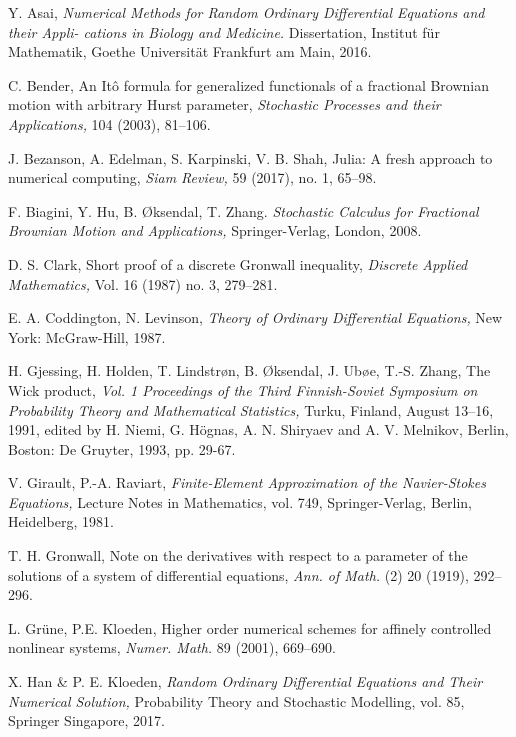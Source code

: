 \documentclass[reqno,12pt]{amsart}
\theoremstyle{plain}%
\theoremstyle{definition}
\begin{document}
\begin{thebibliography}{25}
     Y. Asai, \emph{Numerical Methods for Random Ordinary Differential Equations and their Appli-
    cations in Biology and Medicine.} Dissertation, Institut f\"ur Mathematik, Goethe Universit\"at Frankfurt am Main, 2016. 

     C. Bender, An It\^o formula for generalized functionals of a fractional Brownian motion with arbitrary Hurst parameter, \emph{Stochastic Processes and their Applications,} 104 (2003), 81--106.

     J. Bezanson, A. Edelman, S. Karpinski, V. B. Shah, Julia: A fresh approach to numerical computing, \emph{Siam Review,} 59 (2017), no. 1, 65--98.

     F. Biagini, Y. Hu, B. {\O}ksendal, T. Zhang. \emph{Stochastic Calculus for Fractional Brownian Motion and Applications,} Springer-Verlag, London, 2008.

     D. S. Clark, Short proof of a discrete Gronwall inequality, \emph{Discrete Applied Mathematics,} Vol. 16 (1987) no. 3, 279--281.

     E. A. Coddington, N. Levinson, \emph{Theory of Ordinary Differential Equations,} New York: McGraw-Hill, 1987.

     H. Gjessing, H. Holden, T. Lindstr{\o}n, B. {\O}ksendal, J. Ub{\o}e, T.-S. Zhang, The Wick product, \emph{Vol. 1 Proceedings of the Third Finnish-Soviet Symposium on Probability Theory and Mathematical Statistics,} Turku, Finland, August 13--16, 1991, edited by H. Niemi, G. H\"ognas, A. N. Shiryaev and A. V. Melnikov, Berlin, Boston: De Gruyter, 1993, pp. 29-67.

     V. Girault, P.-A. Raviart, \emph{Finite-Element Approximation of the Navier-Stokes Equations,} Lecture Notes in Mathematics, vol. 749, Springer-Verlag, Berlin, Heidelberg, 1981.

     T. H. Gronwall, Note on the derivatives with respect to a parameter of the solutions of a system of differential equations, \emph{Ann. of Math.} (2) 20 (1919), 292--296.

     L. Gr\"une, P.E. Kloeden, Higher order numerical schemes for affinely controlled nonlinear systems, \emph{Numer. Math.} 89 (2001), 669--690.

     X. Han \& P. E. Kloeden, \emph{Random Ordinary Differential Equations and Their Numerical Solution,} Probability Theory and Stochastic Modelling, vol. 85, Springer Singapore, 2017.


\end{thebibliography}
\end{document}
